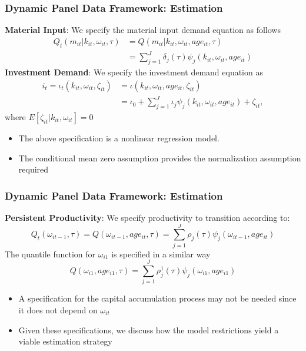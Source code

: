 \documentclass{beamer}
\begin{document}
\begin{frame}
\frametitle{Dynamic Panel Data Framework: Estimation}
\textbf{Material Input}:
We specify the material input demand equation as follows
\begin{equation}\label{mmodel}
\begin{split}
Q_{t}(m_{it}|k_{it}, \omega_{it}, \tau)&=Q(m_{it}|k_{it}, \omega_{it}, age_{it}, \tau)\\
&=\sum_{j=1}^{J}\delta_{j}(\tau)\psi_{j}(k_{it}, \omega_{it}, age_{it})
\end{split}
\end{equation}
\textbf{Investment Demand}:
We specify the investment demand equation as
\begin{equation}\label{imodel}
\begin{split}
i_{t}=\iota_{t}(k_{it}, \omega_{it}, \zeta_{it})&=\iota(k_{it}, \omega_{it}, age_{it}, \zeta_{it})\\
&=\iota_{0}+\sum_{j=1}^{J}\iota_{j}\psi_{j}(k_{it}, \omega_{it}, age_{it})+\zeta_{it},
\end{split}
\end{equation}
where $E[\zeta_{it}|k_{it}, \omega_{it}]=0$
\begin{itemize}
	\item The above specification is a nonlinear regression model.
	\item The conditional mean zero assumption provides the normalization assumption required
\end{itemize}
\end{frame}


\begin{frame}
\frametitle{Dynamic Panel Data Framework: Estimation}
\textbf{Persistent Productivity}:
We specify productivity to transition according to:
\begin{equation}\label{omegamodel}
Q_{t}(\omega_{it-1}, \tau)=Q(\omega_{it-1}, age_{it}, \tau)=\sum_{j=1}^{J}\rho_{j}(\tau)\psi_{j}(\omega_{it-1}, age_{it})
\end{equation}
The quantile function for $\omega_{i1}$ is specified in a similar way
\begin{equation}\label{omegamodel}
Q(\omega_{i1}, age_{i1}, \tau)=\sum_{j=1}^{J}\rho^{1}_{j}(\tau)\psi_{j}(\omega_{i1}, age_{i1})
\end{equation}
\begin{itemize}
	\item A specification for the capital accumulation process may not be needed since it does not depend on $\omega_{it}$
	\item Given these specifications, we discuss how the model restrictions yield a viable estimation strategy
\end{itemize}
\end{frame}
\end{document}
